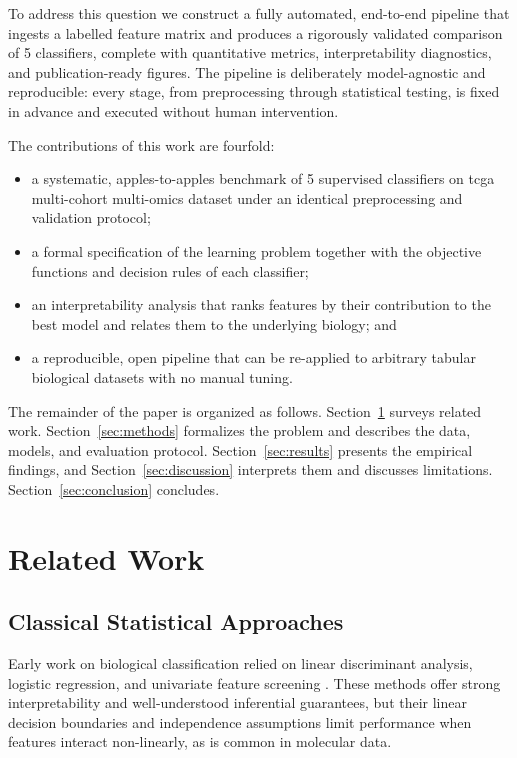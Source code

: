 \documentclass[conference]{IEEEtran}
\begin{document}
To address this question we construct a fully automated, end-to-end pipeline that ingests a
labelled feature matrix and produces a rigorously validated comparison of 5 classifiers,
complete with quantitative metrics, interpretability diagnostics, and publication-ready figures.
The pipeline is deliberately model-agnostic and reproducible: every stage, from preprocessing
through statistical testing, is fixed in advance and executed without human intervention.

The contributions of this work are fourfold:
\begin{itemize}
\item a systematic, apples-to-apples benchmark of 5 supervised classifiers on
tcga multi-cohort multi-omics dataset under an identical preprocessing and validation protocol;
\item a formal specification of the learning problem together with the objective functions
and decision rules of each classifier;
\item an interpretability analysis that ranks features by their contribution to the best model
and relates them to the underlying biology; and
\item a reproducible, open pipeline that can be re-applied to arbitrary tabular biological
datasets with no manual tuning.
\end{itemize}

The remainder of the paper is organized as follows. Section~\ref{sec:related} surveys related
work. Section~\ref{sec:methods} formalizes the problem and describes the data, models, and
evaluation protocol. Section~\ref{sec:results} presents the empirical findings, and
Section~\ref{sec:discussion} interprets them and discusses limitations. Section~\ref{sec:conclusion}
concludes.

\section{Related Work}
\label{sec:related}
\subsection{Classical Statistical Approaches}
Early work on biological classification relied on linear discriminant analysis, logistic
regression, and univariate feature screening \cite{hastie2009elements}. These methods offer
strong interpretability and well-understood inferential guarantees, but their linear decision
boundaries and independence assumptions limit performance when features interact non-linearly,
as is common in molecular data.
\end{document}
